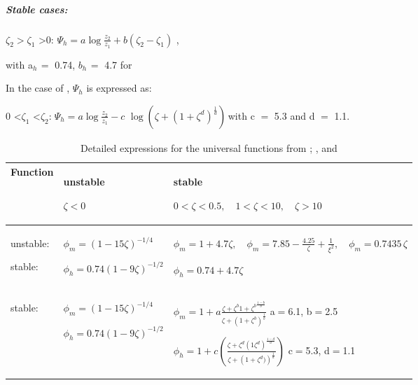 \subparagraph{Stable cases:}

$\zeta_{2 }> \zeta_{1}$ \textgreater 0: $\Psi_{h}
=a\log\frac{z_{2} }{z_{1} }+b(\zeta_{2} -\zeta_{1} )$ ,

with a$_{h\, }=$ 0.74, $b_{h\, }= $ 4.7 for \cite{Businger:1971}

In the case of \cite{Cheng:2005}, $\Psi_{h}$ is expressed as:

0 \textless $\zeta_{1}$ \textless $\zeta_{2}$:$_{\, \, }\Psi_{h} =a \log\frac{z_{2} }{z_{1}
}-c\,\,\log\left( {\zeta+\left( {1+\zeta^{d}} \right)^{\frac{1}{d}}} \right)_{\, }$with c
$=$ 5.3 and d $=$ 1.1.

\begin{table}[htbp]
\begin{center}
\caption[fonction]{Detailed expressions for the universal functions from
  \cite{Businger:1971}; \cite{Hicks:1976}, and \cite{Cheng:2005}
}
\begin{tabular}{|p{74pt}|p{116pt}|p{262pt}|}
\hline
\textbf{Function}&
\textbf{unstable} \par $\zeta <0$&
\textbf{stable}

$0<\zeta <0.5,\quad
1<\zeta <10,\quad
\zeta >10$ \\
\hline
unstable:
\cite{Businger:1971} \par stable: \cite{Hicks:1976}&
$\phi_{m} =\left( {1-15\zeta } \right)^{-1/4}$ \par
$\phi_{h} =0.74\left( {1-9\zeta } \right)^{-1/2}$&
$\phi_{m} =1+4.7\zeta ,\quad
\phi_{m} =7.85-\frac{4.25}{\zeta }+\frac{1}{\xi^{2}},\quad
\phi_{m} =0.7435\,\zeta $ \par $\phi_{h} =0.74+4.7\zeta $ \\
\hline
\cite{Businger:1971} \par stable: \cite{Cheng:2005} \par &

$\phi_{m} =\left( {1-15\zeta }\right)^{-1/4}$

\par
$\phi_{h} =0.74\left( {1-9\zeta } \right)^{-1/2}$&

$\phi_{m} =
1+a\frac{\zeta+\zeta^b{1+\zeta^b}^{\frac{1-b}{b}}} {\zeta+(1+\zeta^b)^{\frac{1}{b}} }$
a$=$6.1, b$=$2.5 \par

$\phi_{h}=
1+c\left(\frac{{\zeta+\zeta^d}\left({1\zeta^d}\right)^{\frac{1-d}{d}}} {\zeta+\left(1+\zeta^d)\right)^{\frac{1}{d}} }\right)$
c$=$5.3, d$=$1.1\small \\
\hline

\end{tabular}
\label{tab:atmo:tab4}
\end{center}
\end{table}

